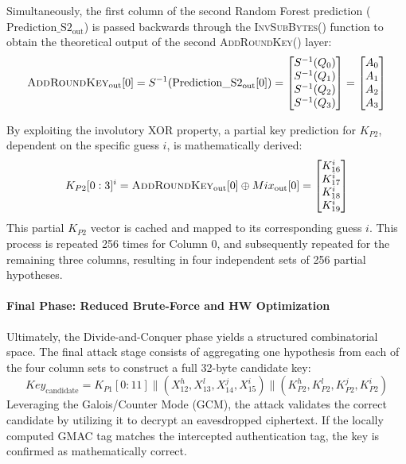 \documentclass[11pt,a4paper]{report}
\begin{document}
Simultaneously, the first column of the second Random Forest prediction ($\text{Prediction\_S2}_{\text{out}}$) 
is passed backwards through the \textsc{InvSubBytes()} function to obtain the theoretical output of the second \textsc{AddRoundKey()} layer:
\begin{equation}
    \textsc{AddRoundKey}_{\text{out}}[0] = S^{-1}\!\left(\text{Prediction\_S2}_{\text{out}}[0]\right)
    = \begin{bmatrix}
        S^{-1}(Q_0) \\
        S^{-1}(Q_1) \\
        S^{-1}(Q_2) \\
        S^{-1}(Q_3)
    \end{bmatrix}
    = \begin{bmatrix}
        A_0 \\
        A_1 \\
        A_2 \\
        A_3
    \end{bmatrix}
\end{equation}

By exploiting the involutory XOR property, a partial key prediction for $K_{P2}$, dependent on the specific guess $i$, is mathematically derived:
\begin{equation}
    K_{P2}[0:3]^{i} = \textsc{AddRoundKey}_{\text{out}}[0] \oplus Mix_{\text{out}}[0] 
    = \begin{bmatrix}
        K^{i}_{16} \\
        K^{i}_{17} \\
        K^{i}_{18} \\
        K^{i}_{19}
    \end{bmatrix}
\end{equation}
This partial $K_{P2}$ vector is cached and mapped to its corresponding guess $i$. 
This process is repeated 256 times for Column 0, and subsequently repeated for the remaining three columns, resulting in four independent sets of 256 partial hypotheses.

\paragraph{Final Phase: Reduced Brute-Force and HW Optimization}
Ultimately, the Divide-and-Conquer phase yields a structured combinatorial space. 
The final attack stage consists of aggregating one hypothesis from each of the four column sets to construct a full 32-byte candidate key:
\[
Key_{\text{candidate}} = K_{P1}[0:11] \parallel (X_{12}^h, X_{13}^l, X_{14}^j, X_{15}^i) \parallel (K_{P2}^{h}, K_{P2}^{l}, K_{P2}^{j}, K_{P2}^{i})
\]
Leveraging the Galois/Counter Mode (GCM), the attack validates the correct candidate by utilizing it to decrypt an eavesdropped ciphertext. 
If the locally computed GMAC tag matches the intercepted authentication tag, the key is confirmed as mathematically correct.
\end{document}
